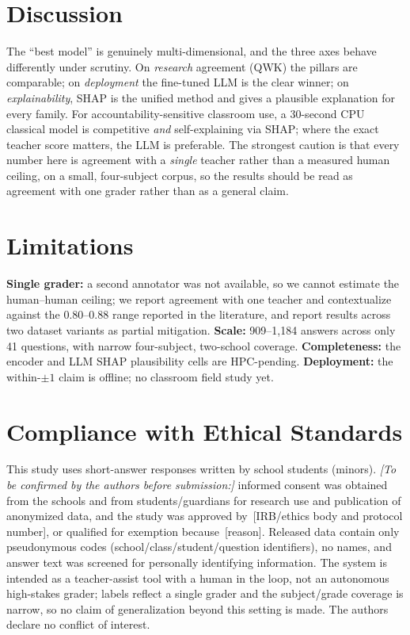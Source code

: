 \documentclass[journal]{IEEEtran}
\begin{document}
\section{Discussion}
The ``best model'' is genuinely multi-dimensional, and the three axes behave differently under
scrutiny. On \emph{research} agreement (QWK) the pillars are comparable; on
\emph{deployment} the fine-tuned LLM is the clear winner; on \emph{explainability}, SHAP is the
unified method and gives a plausible explanation for every family. For
accountability-sensitive classroom use,
a 30-second CPU classical model is competitive \emph{and} self-explaining via SHAP; where the
exact teacher score matters, the LLM is preferable. The strongest caution is that every number here
is agreement with a \emph{single} teacher rather than a measured human ceiling, on a small,
four-subject corpus, so the results should be read as agreement with one grader rather than as a
general claim.

\section{Limitations}
\textbf{Single grader:} a second annotator was not available, so we cannot estimate the
human--human ceiling; we report agreement with one teacher and contextualize against the
$0.80$--$0.88$ range reported in the literature, and report results across two dataset variants
as partial mitigation.
\textbf{Scale:} 909--1{,}184 answers across only 41 questions, with narrow four-subject, two-school
coverage. \textbf{Completeness:} the encoder and LLM SHAP plausibility cells are HPC-pending.
\textbf{Deployment:} the within-$\pm1$ claim is offline; no classroom field study yet.

\section{Compliance with Ethical Standards}\label{sec:ethics}
This study uses short-answer responses written by school students (minors). \emph{[To be confirmed
by the authors before submission:]} informed consent was obtained from the schools and from
students/guardians for research use and publication of anonymized data, and the study was approved
by~[IRB/ethics body and protocol number], or qualified for exemption because~[reason]. Released
data contain only pseudonymous codes (school/class/student/question identifiers), no names, and
answer text was screened for personally identifying information. The system is intended as a
teacher-assist tool with a human in the loop, not an autonomous high-stakes grader; labels reflect
a single grader and the subject/grade coverage is narrow, so no claim of generalization beyond this
setting is made. The authors declare no conflict of interest.
\end{document}
